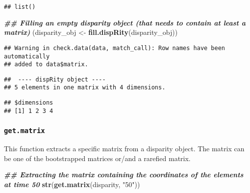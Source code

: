 \documentclass[
]{book}
\newenvironment{Shaded}{\begin{snugshade}}{\end{snugshade}}
\newcommand{\DocumentationTok}[1]{\textcolor[rgb]{0.56,0.35,0.01}{\textbf{\textit{#1}}}}
\newcommand{\FunctionTok}[1]{\textcolor[rgb]{0.13,0.29,0.53}{\textbf{#1}}}
\newcommand{\NormalTok}[1]{#1}
\newcommand{\OtherTok}[1]{\textcolor[rgb]{0.56,0.35,0.01}{#1}}
\newcommand{\SpecialCharTok}[1]{\textcolor[rgb]{0.81,0.36,0.00}{\textbf{#1}}}
\newcommand{\StringTok}[1]{\textcolor[rgb]{0.31,0.60,0.02}{#1}}
\begin{document}
\begin{verbatim}
## list()
\end{verbatim}

\begin{Shaded}
\begin{Highlighting}[]
\DocumentationTok{\#\# Filling an empty disparity object (that needs to contain at least a matrix)}
\NormalTok{(disparity\_obj }\OtherTok{\textless{}{-}} \FunctionTok{fill.dispRity}\NormalTok{(disparity\_obj))}
\end{Highlighting}
\end{Shaded}

\begin{verbatim}
## Warning in check.data(data, match_call): Row names have been automatically
## added to data$matrix.
\end{verbatim}

\begin{verbatim}
##  ---- dispRity object ---- 
## 5 elements in one matrix with 4 dimensions.
\end{verbatim}

\begin{Shaded}
\end{Shaded}

\begin{verbatim}
## $dimensions
## [1] 1 2 3 4
\end{verbatim}

\hypertarget{get.matrix}{%
\subsubsection{\texorpdfstring{\texttt{get.matrix}}{get.matrix}}\label{get.matrix}}

This function extracts a specific matrix from a disparity object.
The matrix can be one of the bootstrapped matrices or/and a rarefied matrix.

\begin{Shaded}
\begin{Highlighting}[]
\DocumentationTok{\#\# Extracting the matrix containing the coordinates of the elements at time 50}
\FunctionTok{str}\NormalTok{(}\FunctionTok{get.matrix}\NormalTok{(disparity, }\StringTok{"50"}\NormalTok{))}
\end{Highlighting}
\end{Shaded}
\end{document}
